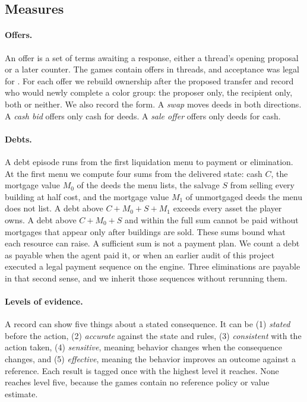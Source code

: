 \subsection{Measures}
\paragraph{Offers.}
An offer is a set of terms awaiting a response, either a thread's opening proposal or a later counter. The games contain  offers in  threads, and acceptance was legal for . For each offer we rebuild ownership after the proposed transfer and record who would newly complete a color group: the proposer only, the recipient only, both or neither. We also record the form. A \emph{swap} moves deeds in both directions. A \emph{cash bid} offers only cash for deeds. A \emph{sale offer} offers only deeds for cash.

\paragraph{Debts.}
A debt episode runs from the first liquidation menu to payment or elimination. At the first menu we compute four sums from the delivered state: cash $C$, the mortgage value $M_0$ of the deeds the menu lists, the salvage $S$ from selling every building at half cost, and the mortgage value $M_1$ of unmortgaged deeds the menu does not list. A debt above $C+M_0+S+M_1$ exceeds every asset the player owns. A debt above $C+M_0+S$ and within the full sum cannot be paid without mortgages that appear only after buildings are sold. These sums bound what each resource can raise. A sufficient sum is not a payment plan. We count a debt as payable when the agent paid it, or when an earlier audit of this project executed a legal payment sequence on the engine. Three eliminations are payable in that second sense, and we inherit those sequences without rerunning them.

\paragraph{Levels of evidence.}
A record can show five things about a stated consequence. It can be (1) \emph{stated} before the action, (2) \emph{accurate} against the state and rules, (3) \emph{consistent} with the action taken, (4) \emph{sensitive}, meaning behavior changes when the consequence changes, and (5) \emph{effective}, meaning the behavior improves an outcome against a reference. Each result is tagged once with the highest level it reaches. None reaches level five, because the games contain no reference policy or value estimate.

